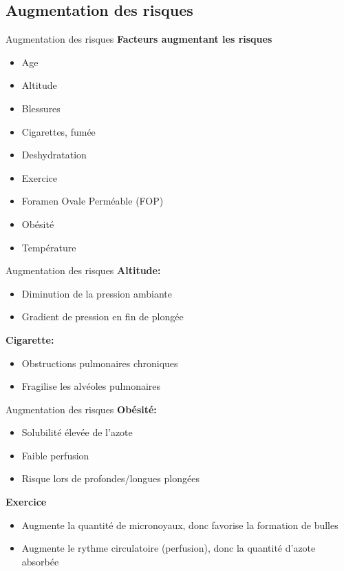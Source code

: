\subsection{Augmentation des risques}
\begin{frame}{Augmentation des risques}
	\textbf{Facteurs augmentant les risques}
	\begin{itemize}
		\item Age
		\item Altitude
		\item Blessures
		\item Cigarettes, fumée
		\item Deshydratation
		\item Exercice
		\item Foramen Ovale Perméable (FOP)
		\item Obésité
		\item Température
	\end{itemize}
\end{frame}

\begin{frame}{Augmentation des risques}  
	\textbf{Altitude:}	
	\begin{itemize}
			\item Diminution de la pression ambiante
			\item Gradient de pression en fin de plongée 
		\end{itemize}

	\textbf{Cigarette:}	
	\begin{itemize}
		\item Obstructions pulmonaires chroniques
		\item Fragilise les alvéoles pulmonaires
	\end{itemize}
\end{frame}

\begin{frame}{Augmentation des risques}
	\textbf{Obésité:}	
	\begin{itemize}
		\item Solubilité élevée de l'azote
		\item Faible perfusion
		\item Risque lors de profondes/longues plongées
	\end{itemize}
	\textbf{Exercice}	
	\begin{itemize}
		\item Augmente la quantité de micronoyaux, donc favorise la formation de bulles
		\item Augmente le rythme circulatoire (perfusion), donc la quantité d'azote absorbée
	\end{itemize}
\end{frame}

